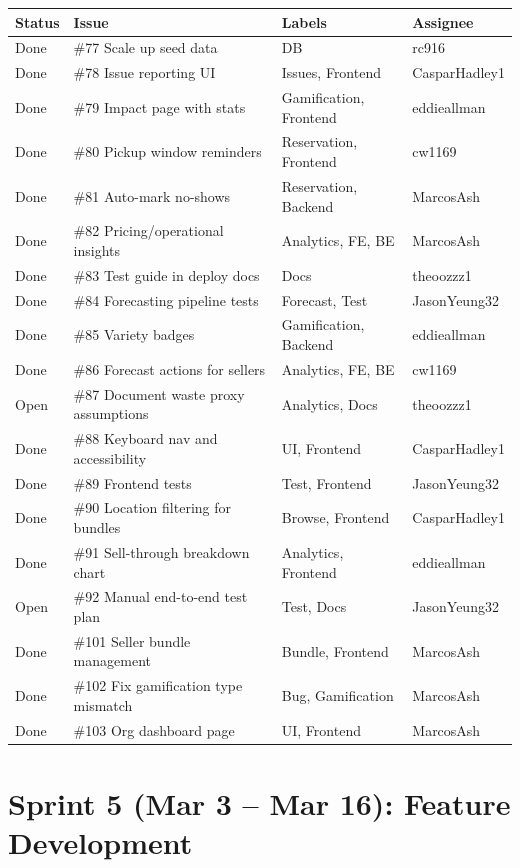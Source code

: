 \documentclass[a4paper,11pt]{article}
\begin{document}
{\small
\begin{tabular}{l l l l}
\toprule
Status & Issue & Labels & Assignee \\
\midrule
Done & \#77 Scale up seed data & DB & rc916 \\
Done & \#78 Issue reporting UI & Issues, Frontend & CasparHadley1 \\
Done & \#79 Impact page with stats & Gamification, Frontend & eddieallman \\
Done & \#80 Pickup window reminders & Reservation, Frontend & cw1169 \\
Done & \#81 Auto-mark no-shows & Reservation, Backend & MarcosAsh \\
Done & \#82 Pricing/operational insights & Analytics, FE, BE & MarcosAsh \\
Done & \#83 Test guide in deploy docs & Docs & theoozzz1 \\
Done & \#84 Forecasting pipeline tests & Forecast, Test & JasonYeung32 \\
Done & \#85 Variety badges & Gamification, Backend & eddieallman \\
Done & \#86 Forecast actions for sellers & Analytics, FE, BE & cw1169 \\
Open & \#87 Document waste proxy assumptions & Analytics, Docs & theoozzz1 \\
Done & \#88 Keyboard nav and accessibility & UI, Frontend & CasparHadley1 \\
Done & \#89 Frontend tests & Test, Frontend & JasonYeung32 \\
Done & \#90 Location filtering for bundles & Browse, Frontend & CasparHadley1 \\
Done & \#91 Sell-through breakdown chart & Analytics, Frontend & eddieallman \\
Open & \#92 Manual end-to-end test plan & Test, Docs & JasonYeung32 \\
Done & \#101 Seller bundle management & Bundle, Frontend & MarcosAsh \\
Done & \#102 Fix gamification type mismatch & Bug, Gamification & MarcosAsh \\
Done & \#103 Org dashboard page & UI, Frontend & MarcosAsh \\
\bottomrule
\end{tabular}
}

\section*{Sprint 5 (Mar 3 -- Mar 16): Feature Development}
\end{document}
